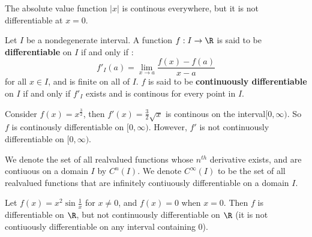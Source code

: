 \begin{example}
    The absolute value function $|x|$ is continous everywhere, but it is not 
    differentiable at $x=0$.
\end{example} 

\begin{definition}
    Let $I$ be a nondegenerate interval. A function  $f:I \rightarrow \R$ is said to be 
    \textbf{differentiable} on  $I$ if and only if :
         \begin{equation}
             f'_I(a)=\lim_{x \rightarrow a}{\frac{f(x)-f(a)}{x-a}}
        \end{equation} 
    for all $x \in I$, and is finite on all of $I$. $f$ is said to be \textbf{continuously differentiable} 
    on  $I$ if and only if  $f'_I$ exists and is continous for every point in  $I$.
\end{definition}

\begin{example}
    Consider $f(x)=x^{\frac{3}{2}}$, then $f'(x)=\frac{3}{2}\sqrt{x}$ is 
    continous on the interval$ [0, \infty)$. So $f$ is continously differentiable on $[0,\infty)$. 
    However,  $f'$ is not continuously differentiable on  $[0, \infty)$.
\end{example}

We denote the set of all realvalued functions whose $n^{th}$ derivative exists, and 
are contiuous on a domain  $I$ by  $C^n(I)$. We denote  $C^{\infty}(I)$ to be the 
set of all  realvalued functions that are infinitely contiuously differentiable on a domain 
 $I$.

  \begin{example}
      Let $f(x)=x^2\sin{\frac{1}{x}}$ for $x \neq 0$, and $f(x)=0$ when $x=0$. Then 
      $f$ is differentiable on $\R$, but not continuously differentiable on  $\R$ (it is 
      not contiuously differentiable on any interval containing $0$).
 \end{example} 
